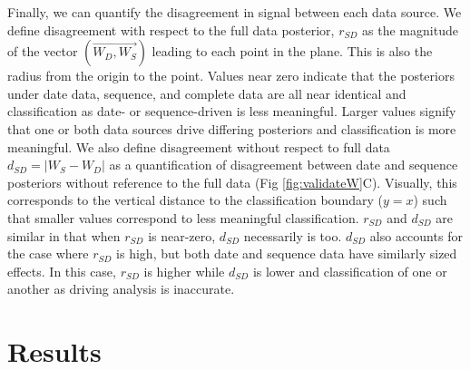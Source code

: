 \documentclass{article}
\begin{document}
Finally, we can quantify the disagreement in signal between each data source. We define disagreement with respect to the full data posterior, $r_{SD}$ as the magnitude of the vector $(\overrightarrow{W_{D}, W_{S}})$ leading to each point in the plane. This is also the radius from the origin to the point. Values near zero indicate that the posteriors under date data, sequence, and complete data are all near identical and classification as date- or sequence-driven is less meaningful. Larger values signify that one or both data sources drive differing posteriors and classification is more meaningful. We also define disagreement without respect to full data $d_{SD} = | W_{S} - W_{D} |$ as a quantification of disagreement between date and sequence posteriors without reference to the full data (Fig \ref{fig:validateW}C). Visually, this corresponds to the vertical distance to the classification boundary ($y=x$) such that smaller values correspond to less meaningful classification. $r_{SD}$ and $d_{SD}$ are similar in that when $r_{SD}$ is near-zero,  $d_{SD}$ necessarily is too. $d_{SD}$ also accounts for the case where $r_{SD}$ is high, but both date and sequence data have similarly sized effects. In this case, $r_{SD}$ is higher while $d_{SD}$ is lower and classification of one or another as driving analysis is inaccurate. 

\section*{Results}


\end{document}
